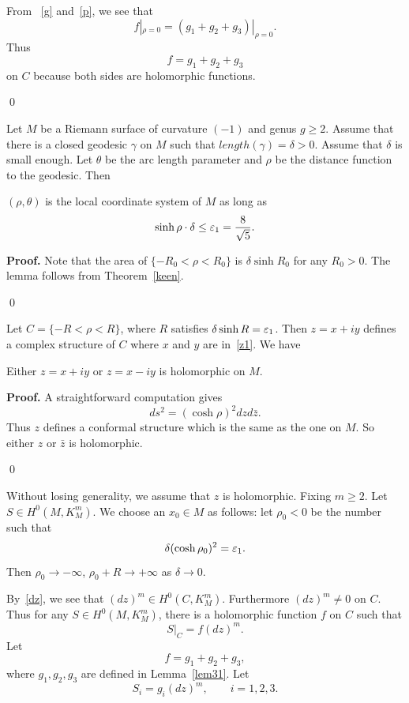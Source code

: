 From ~\eqref{g} and~\eqref{p}, we see that 
\[
f|_{\rho=0}=(g_1+g_2+g_3)|_{\rho=0}.
\]
Thus
\[
f=g_1+g_2+g_3
\]
on $C$
because both sides are holomorphic functions.

\qed


Let $M$ be a Riemann surface of curvature $(-1)$ and genus $g\geq 2$.
Assume that there is a closed geodesic $\gamma$ on $M$ such that
$length(\gamma)=\delta>0$. Assume that $\delta$ is small enough. Let
$\theta$ be the arc length parameter and $\rho$ be the distance function
to the geodesic. Then

\begin{lemma} $(\rho,\theta)$ is the local coordinate system of $M$ as
long
as 
\[
\sinh\rho\cdot\delta\leq\varepsilon_1=\frac{8}{\sqrt{5}}.
\]
\end{lemma}

{\bf Proof.} 
Note that the area of $\{-R_0<\rho<R_0\}$ is $\delta\sinh R_0$
for any $R_0>0$. The lemma follows from Theorem~\ref{keen}.

\qed

Let $C=\{-R<\rho<R\}$, where
$R$ satisfies $\delta\sinh R=\varepsilon_1$.
Then $z=x+iy$
defines a complex structure of $C$
where $x$ and $y$ are in~\eqref{z1}. We have

\begin{lemma}
Either $z=x+iy$ or $z=x-iy$ is holomorphic on $M$.
\end{lemma}

{\bf Proof.}
A straightforward computation gives
\[
ds^2=(\cosh\rho)^2 dz d\bar z.
\]
Thus $z$ defines a conformal structure which is the same as the one on
$M$. So either $z$ or $\bar z$ is holomorphic.

\qed
 
Without losing generality, we assume that $z$ is
holomorphic.
Fixing $m\geq 2$. 
Let $S\in H^0(M,K_M^m)$. We choose an $x_0\in M$ as follows:
let $\rho_0<0$ be the number such that
\[
\delta (\cosh\rho_0)^2=\varepsilon_1.
\]
Then $\rho_0\rightarrow -\infty$, $\rho_0+R\rightarrow +\infty$ as
$\delta\rightarrow 0$.

By~\eqref{dz}, we see that $(dz)^m\in H^0(C,K_M^m)$. Furthermore
$(dz)^m\neq 0$ on $C$. Thus for any $S\in H^0(M,K_M^m)$, there is
a holomorphic function $f$ on $C$ such that
\[
S|_C=f (dz)^m.
\]
Let
\[
f=g_1+g_2+g_3,
\]
where $g_1,g_2,g_3$ are defined in Lemma~\ref{lem31}. Let
\begin{equation}\label{defs}
S_i=g_i (dz)^m,\qquad i=1,2,3.
\end{equation}

























